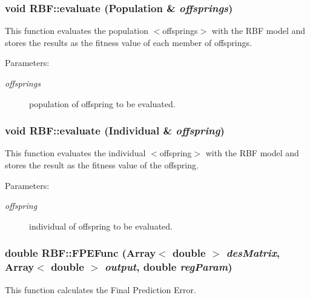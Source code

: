 \subsubsection{\setlength{\rightskip}{0pt plus 5cm}void RBF::evaluate (Population \& {\em offsprings})}\label{classRBF_a6}


This function evaluates the population $<$offsprings$>$ with the RBF model and stores the results as the fitness value of each member of offsprings. 

\begin{Desc}
\item[Parameters:]
\begin{description}
\item[{\em offsprings}]population of offspring to be evaluated.\end{description}
\end{Desc}
\subsubsection{\setlength{\rightskip}{0pt plus 5cm}void RBF::evaluate (Individual \& {\em offspring})}\label{classRBF_a5}


This function evaluates the individual $<$offspring$>$ with the RBF model and stores the result as the fitness value of the offspring. 

\begin{Desc}
\item[Parameters:]
\begin{description}
\item[{\em offspring}]individual of offspring to be evaluated.\end{description}
\end{Desc}
\subsubsection{\setlength{\rightskip}{0pt plus 5cm}double RBF::FPEFunc (Array$<$ double $>$ {\em des\-Matrix}, Array$<$ double $>$ {\em output}, double {\em reg\-Param})\hspace{0.3cm}{\tt  [static]}}\label{classRBF_e10}


This function calculates the Final Prediction Error. 

